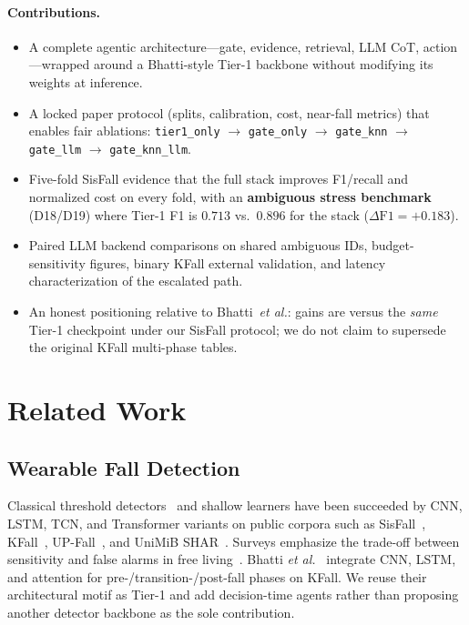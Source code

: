 \documentclass[journal]{IEEEtran}
\begin{document}
\paragraph{Contributions.}
\begin{itemize}
\item A complete agentic architecture---gate, evidence, retrieval, LLM CoT, action---wrapped around a Bhatti-style Tier-1 backbone without modifying its weights at inference.
\item A locked paper protocol (splits, calibration, cost, near-fall metrics) that enables fair ablations: \texttt{tier1\_only} $\rightarrow$ \texttt{gate\_only} $\rightarrow$ \texttt{gate\_knn} $\rightarrow$ \texttt{gate\_llm} $\rightarrow$ \texttt{gate\_knn\_llm}.
\item Five-fold SisFall evidence that the full stack improves F1/recall and normalized cost on every fold, with an \textbf{ambiguous stress benchmark} (D18/D19) where Tier-1 F1 is $0.713$ vs.\ $0.896$ for the stack ($\Delta\text{F1}{=}+0.183$).
\item Paired LLM backend comparisons on shared ambiguous IDs, budget-sensitivity figures, binary KFall external validation, and latency characterization of the escalated path.
\item An honest positioning relative to Bhatti~\textit{et al.}: gains are versus the \emph{same} Tier-1 checkpoint under our SisFall protocol; we do not claim to supersede the original KFall multi-phase tables.
\end{itemize}

\section{Related Work}
\label{sec:related}

\subsection{Wearable Fall Detection}
Classical threshold detectors~\cite{bourke2007threshold} and shallow learners have been succeeded by CNN, LSTM, TCN, and Transformer variants on public corpora such as SisFall~\cite{sisfall2017}, KFall~\cite{kfall2021}, UP-Fall~\cite{martinez2019upfall}, and UniMiB SHAR~\cite{micucci2017unimib}. Surveys emphasize the trade-off between sensitivity and false alarms in free living~\cite{iglesias2019wearable,khan2017review,ren2021survey}. Bhatti \textit{et al.}~\cite{bhatti2025beyond} integrate CNN, LSTM, and attention for pre-/transition-/post-fall phases on KFall. We reuse their architectural motif as Tier-1 and add decision-time agents rather than proposing another detector backbone as the sole contribution.
\end{document}
